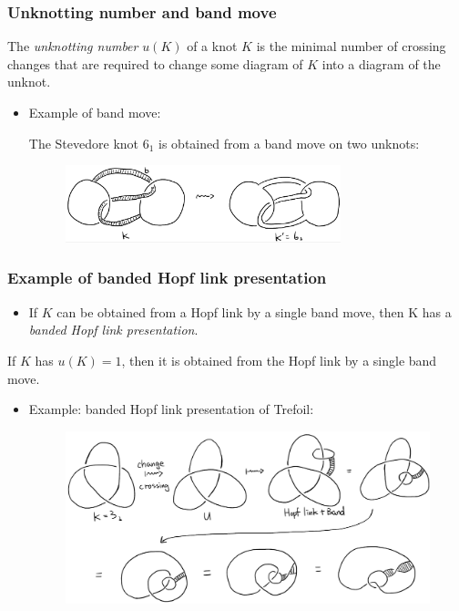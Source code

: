 \documentclass{beamer}
\theoremstyle{ex}
\theoremstyle{rem}
\begin{document}
\begin{frame}
	\frametitle{Unknotting number and band move}
	\begin{definition}
		The \textit{unknotting number} $u(K)$ of a knot $K$ is the minimal number of crossing changes that are required to change some diagram of $K$ into a diagram of the unknot.
	\end{definition}
	\begin{itemize}
		
		\item Example of band move:
		
		The Stevedore knot $6_1$ is obtained from a band move on two unknots:
		\begin{figure}
			\hspace*{-1.5cm}\begin{center}{\includegraphics [width=8cm] {bandmove}}\end{center}
		\end{figure}
	\end{itemize}
	
\end{frame}


\begin{frame}
	\frametitle{Example of banded Hopf link presentation}
	\begin{itemize}
		\item If $K$ can be obtained from a Hopf link by a single band move, then K has a \textit{banded Hopf link presentation}.
	\end{itemize}
	\begin{theorem}
		If $K$ has $u(K)=1$, then it is obtained from the Hopf link by a single band move. 
	\end{theorem}
	\begin{itemize}
		\item Example: banded Hopf link presentation of Trefoil:
		\begin{figure}
			\begin{center}{\includegraphics [scale=0.3] {trefoil}}\end{center}
		\end{figure}
	\end{itemize}
\end{frame}
\end{document}
